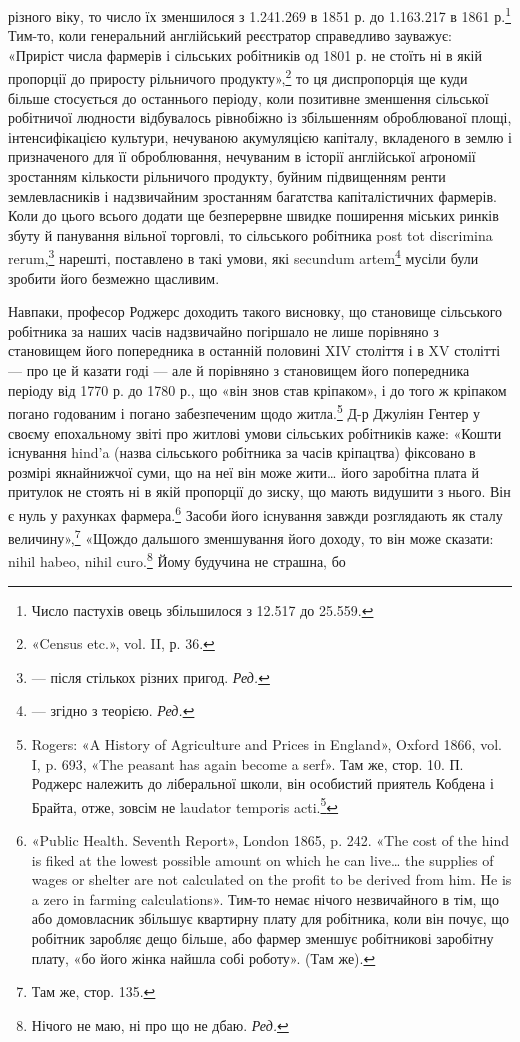 \parcont{}  %
різного віку, то число їх зменшилося з 1.241.269 в 1851 р. до
1.163.217 в 1861 р.\footnote{
Число пастухів овець збільшилося з 12.517 до 25.559.
} Тим-то, коли генеральний англійський
реєстратор справедливо зауважує: «Приріст числа фармерів і
сільських робітників од 1801 р. не стоїть ні в якій пропорції
до приросту рільничого продукту»,\footnote{
«Census etc.», vol. II, р. 36.
} то ця диспропорція ще
куди більше стосується до останнього періоду, коли позитивне
зменшення сільської робітничої людности відбувалось рівнобіжно
із збільшенням оброблюваної площі, інтенсифікацією культури,
нечуваною акумуляцією капіталу, вкладеного в землю і призначеного
для її оброблювання, нечуваним в історії англійської
аґрономії зростанням кількости рільничого продукту, буйним
підвищенням ренти землевласників і надзвичайним зростанням
багатства капіталістичних фармерів. Коли до цього всього додати
ще безперервне швидке поширення міських ринків збуту й
панування вільної торговлі, то сільського робітника post tot
discrimina rerum,\footnote*{
— після стількох різних пригод. \emph{Ред.}
} нарешті, поставлено в такі умови, які secundum
artem\footnote*{
— згідно з теорією. \emph{Ред.}
} мусіли були зробити його безмежно щасливим.

Навпаки, професор Роджерс доходить такого висновку, що
становище сільського робітника за наших часів надзвичайно
погіршало не лише порівняно з становищем його попередника
в останній половині XIV століття і в XV столітті — про це й
казати годі — але й порівняно з становищем його попередника
періоду від 1770 р. до 1780 р., що «він знов став кріпаком», і
до того ж кріпаком погано годованим і погано забезпеченим щодо
житла.\footnote{
Rogers: «A History of Agriculture and Prices in England», Oxford
1866, vol. I, p. 693, «The peasant has again become a serf». Там же, стор. 10.
П. Роджерс належить до ліберальної школи, він особистий приятель
Кобдена і Брайта, отже, зовсім не laudator temporis acti.\footnote*{
— хвалій минулих часів. \emph{Ред.}
}
} Д-р Джуліян Гентер у своєму епохальному звіті про
житлові умови сільських робітників каже: «Кошти існування
hind’a (назва сільського робітника за часів кріпацтва) фіксовано
в розмірі якнайнижчої суми, що на неї він може жити\dots{} його
заробітна плата й притулок не стоять ні в якій пропорції до зиску,
що мають видушити з нього. Він є нуль у рахунках фармера.\footnote{
«Public Health. Seventh Report», London 1865, p. 242. «The cost of
the hind is fiked at the lowest possible amount on which he can live\dots{} the
supplies of wages or shelter are not calculated on the profit to be derived
from him. He is a zero in farming calculations». Тим-то немає нічого незвичайного
в тім, що або домовласник збільшує квартирну плату для робітника,
коли він почує, що робітник заробляє дещо більше, або фармер
зменшує робітникові заробітну плату, «бо його жінка найшла собі
роботу». (Там же).
}
Засоби його існування завжди розглядають як сталу величину»,\footnote{
Там же, стор. 135.
}
«Щождо дальшого зменшування його доходу, то він може сказати:
nihil habeo, nihil curo.\footnote*{
Нічого не маю, ні про що не дбаю. \emph{Ред.}
} Йому будучина не страшна, бо
\parbreak{}  %
